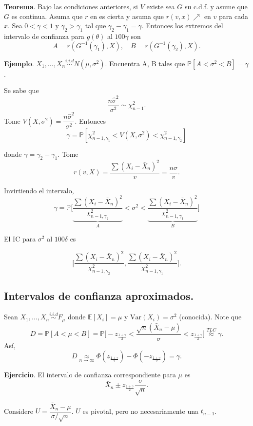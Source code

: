 \documentclass[
  12pt,
]{book}
\begin{document}
\textbf{Teorema}. Bajo las condiciones anteriores, si \(V\) existe sea \(G\) su c.d.f. y asume que \(G\) es continua. Asuma que \(r\) en es cierta y asuma que \(r(v,x) \nearrow\) en \(v\) para cada \(x\). Sea \(0<\gamma<1\) y \(\gamma_2>\gamma_1\) tal que \(\gamma_2-\gamma_1 = \gamma\). Entonces los extremos del intervalo de confianza para \(g(\theta)\) al \(100\gamma\) son
\[A=r(G^{-1}(\gamma_1),X), \quad B=r(G^{-1}(\gamma_2),X).\]

\textbf{Ejemplo}. \(X_1,\dots, X_n \stackrel{i.i.d}{\sim} N(\mu,\sigma^2)\). Encuentra A, B tales que \(\mathbb P[A<\sigma^2<B] = \gamma\).

Se sabe que \[\dfrac{n\hat\sigma^2}{\sigma^2}\sim \chi^2_{n-1}.\]
Tome \(V(X,\sigma^2) = \dfrac{n\hat\sigma^2}{\sigma^2}\). Entonces
\[\gamma = \mathbb P[\chi^2_{n-1,\gamma_1}<V(X,\sigma^2)<\chi^2_{n-1,\gamma_2}]\]

donde \(\gamma = \gamma_2-\gamma_1\). Tome
\[r(v,X) =\dfrac{\sum(X_i -\bar X_n) ^2}{v} = \dfrac{n\hat\sigma}{v}.\]

Invirtiendo el intervalo,
\[\gamma = \mathbb P \bigg[ \underbrace{\dfrac{\sum(X_i -\bar X_n) ^2}{\chi^2_{n-1,\gamma_2}}}
_{A} <\sigma^2<\underbrace{\dfrac{\sum(X_i -\bar X_n) ^2}{\chi^2_{n-1,\gamma_1}}}_B\bigg]\]

El IC para \(\sigma^2\) al \(100\delta\) es

\[ \Bigg[ \dfrac{\sum(X_i -\bar X_n) ^2}{\chi^2_{n-1,\gamma_2}},
\dfrac{\sum(X_i -\bar X_n) ^2}{\chi^2_{n-1,\gamma_1}}\Bigg].\]

\hypertarget{intervalos-de-confianza-aproximados.}{%
\subsection{Intervalos de confianza aproximados.}\label{intervalos-de-confianza-aproximados.}}

Sean \(X_1,\dots, X_n \stackrel{i.i.d}{\sim}F_{\mu}\) donde \(\mathbb E[X_i] = \mu\) y \(\text{Var}(X_i) = \sigma^2\) (conocida). Note que
\[D = \mathbb P[A<\mu<B] = \mathbb P \bigg[-z_{\frac{1+\gamma}2}<\dfrac{\sqrt n(\bar X_n-\mu)}{\sigma} <z_{\frac{1+\gamma}2}\bigg] \stackrel{TLC}{\approx} \gamma.\]
Así,
\[D \underset{n\to\infty}{\approx} \Phi\left(z_{\frac{1+\gamma}2}\right)-\Phi\left(-z_{\frac{1+\gamma}2}\right) = \gamma.\]

\textbf{Ejercicio}. El intervalo de confianza correspondiente para \(\mu\) es
\[\bar X_n \pm z_{\frac{1+\gamma}2}\dfrac{\sigma}{\sqrt n}.\]

Considere \(U = \dfrac{\bar X_n - \mu}{\sigma/\sqrt n}\). \(U\) es pivotal, pero no necesariamente una \(t_{n-1}\).
\end{document}
